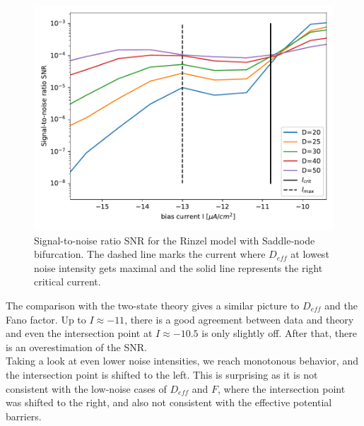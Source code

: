 \documentclass[12pt,a4paper]{article}
\begin{document}
\begin{figure}[H]
	\centering
	\includegraphics[scale=0.95]{snrinzelonlycritmax.pdf}\caption{Signal-to-noise ratio SNR for the Rinzel model with Saddle-node bifurcation. The dashed line marks the current where $D_{eff}$ at lowest noise intensity gets maximal and the solid line represents the right critical current.}
	\label{specrinzel}
\end{figure}
The comparison with the two-state theory gives a similar picture to $D_{eff}$ and the Fano factor. Up to $I\approx-11$, there is a good agreement between data and theory and even the intersection point at $I\approx-10.5$ is only slightly off. After that, there is an overestimation of the SNR.  
\\
Taking a look at even lower noise intensities, we reach monotonous behavior, and the intersection point is shifted to the left. This is surprising as it is not consistent with the low-noise cases of $D_{eff}$ and $F$, where the intersection point was shifted to the right, and also not consistent with the effective potential barriers.
\end{document}
